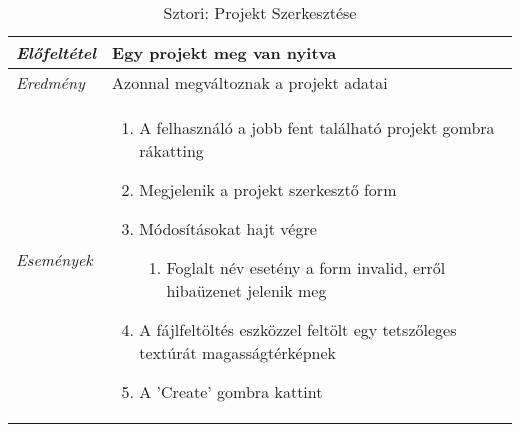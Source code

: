 \begin{table}[H]
	\centering
	\begin{tabular}{ | m{} | m{} | }
		\hline
		\emph{Előfeltétel} & Egy projekt meg van nyitva  \\
		\hline
		\emph{Eredmény} & Azonnal megváltoznak a projekt adatai  \\
		\hline
		\emph{Események} &

		\begin{enumerate}
			\item A felhasználó a jobb fent található projekt gombra rákatting
			\item Megjelenik a projekt szerkesztő form
			\item Módosításokat hajt végre



			\begin{enumerate}
				\item Foglalt név esetény a form invalid, erről hibaüzenet jelenik meg
			\end{enumerate}
			\item A fájlfeltöltés eszközzel feltölt egy tetszőleges textúrát magasságtérképnek
			\item A 'Create' gombra kattint
		\end{enumerate}

		\\
		\hline
	\end{tabular}
	\caption{Sztori: Projekt Szerkesztése}
	\label{tab:story-project-edit}
\end{table}
